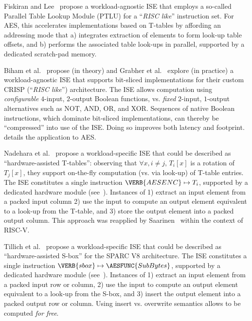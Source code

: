       Fiskiran and Lee~\cite{FisLee:05}
      propose 
      a workload-agnostic ISE
      that employs a so-called
      Parallel Table Lookup Module (PTLU) for a ``{\em RISC like}''
      instruction set.
      For AES, 
      this accelerates implementations based on T-tables 
      by affording an addressing mode that
      a) integrates 
         extraction of elements to form look-up table offsets,
         and
      b) performs the associated table look-ups in parallel, supported by
         a dedicated scratch-pad memory.

      Biham et al.~\cite[Page 232]{BihAndKnu:98}
      propose (in theory)
      and
      Grabher et al.~\cite{GraGroPag:08}
      explore  (in practice)
      a workload-agnostic ISE
      that supports bit-sliced implementations for their custom
      CRISP (``{\em RISC like}'') architecture.
      The ISE allows computation using 
      {\em configurable} $4$-input, $2$-output 
      Boolean functions, vs. 
      {\em fixed}        $2$-input, $1$-output alternatives such as NOT, AND, OR, and XOR.
      Sequences of native Boolean instructions, which dominate bit-sliced
      implementations, can thereby be ``compressed'' into use of the ISE.
      Doing so improves both latency and footprint.
      \cite[Section 4]{GraGroPag:08} details the application to AES.


      Nadehara et al.~\cite{NadIkeKur:04} 
      propose 
      a workload-specific ISE
       that could be described as 
      ``hardware-assisted T-tables'':
      observing that $\forall x, i \neq j$, $T_i[ x ]$ is a rotation of
      $T_j[ x ]$, they support on-the-fly computation (vs. via look-up)
      of T-table entries.
      The ISE constitutes a single instruction
      $\VERB{AESENC} \mapsto T_i$,
      supported by a dedicated hardware module
      (see~\cite[Figure 6]{NadIkeKur:04}).
      Instances of 
      1) extract an   input element from a 
         packed  input column
      2) use the input to compute an output element equivalent to a
         look-up from the T-table,
         and
      3) store   the output element into a
         packed output column.
      This approach was reapplied by Saarinen~\cite{Saarinen:20}
      within the context of RISC-V.

      Tillich et al.~\cite{TilGroSze:05}
      propose 
      a workload-specific ISE
       that could be described as 
      ``hardware-assisted S-box'' for the SPARC V8 architecture.
      The ISE constitutes a single instruction
      $\VERB{sbox} \mapsto \AESFUNC{SubBytes}$,
      supported by a dedicated hardware module
      (see~\cite[Figure 1]{TilGroSze:05}).
      Instances of 
      1) extract an   input element from a packed  input row or column,
      2) use the input to compute an output element equivalent to a
         look-up from the S-box,
         and
      3)  insert the output element into a packed output row or column.
         Using insert vs. overwrite semantics allows
          to be computed {\em for free}.

